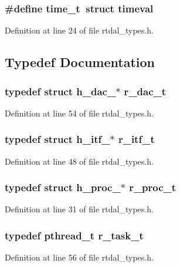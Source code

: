\subsubsection[{time\-\_\-t}]{\setlength{\rightskip}{0pt plus 5cm}\#define time\-\_\-t~struct timeval}\label{rtdal__types_8h_a7157cbb87d46be33f7f913fa09144900}


Definition at line 24 of file rtdal\-\_\-types.\-h.



\subsection{Typedef Documentation}
\subsubsection[{r\-\_\-dac\-\_\-t}]{\setlength{\rightskip}{0pt plus 5cm}typedef struct {\bf h\-\_\-dac\-\_\-}$\ast$ {\bf r\-\_\-dac\-\_\-t}}\label{rtdal__types_8h_aa78f7bbd07935ad587fc182f06d4314c}


Definition at line 54 of file rtdal\-\_\-types.\-h.

\subsubsection[{r\-\_\-itf\-\_\-t}]{\setlength{\rightskip}{0pt plus 5cm}typedef struct {\bf h\-\_\-itf\-\_\-}$\ast$ {\bf r\-\_\-itf\-\_\-t}}\label{rtdal__types_8h_a95fa1c8ca0f279eeb420f2083f6bee5d}


Definition at line 48 of file rtdal\-\_\-types.\-h.

\subsubsection[{r\-\_\-proc\-\_\-t}]{\setlength{\rightskip}{0pt plus 5cm}typedef struct {\bf h\-\_\-proc\-\_\-}$\ast$ {\bf r\-\_\-proc\-\_\-t}}\label{rtdal__types_8h_a9a6d36a76828ee198254e7084107ca38}


Definition at line 31 of file rtdal\-\_\-types.\-h.

\subsubsection[{r\-\_\-task\-\_\-t}]{\setlength{\rightskip}{0pt plus 5cm}typedef pthread\-\_\-t {\bf r\-\_\-task\-\_\-t}}\label{rtdal__types_8h_a30e668fd84aa9b5dacaa84e2bcfde194}


Definition at line 56 of file rtdal\-\_\-types.\-h.

